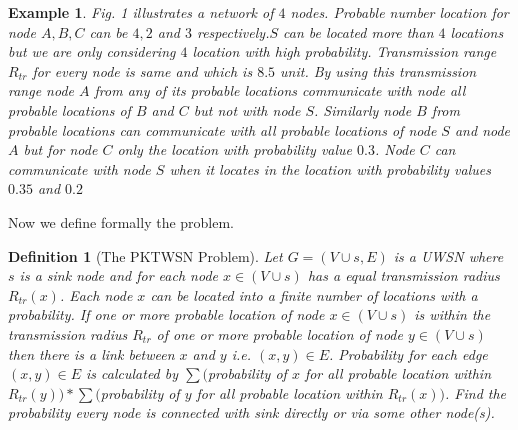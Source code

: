 \documentclass[12pt]{article}
\newtheorem*{defi}{Definition}
\newtheorem{exmp}{Example}[section]
\begin{document}
\begin{exmp}
Fig. 1 illustrates a network of $4$ nodes. Probable number location for node $A, B,C$ can be $4,2$ and $3$  respectively.$S$ can be located more than $4$ locations but we are only considering $4$ location with high probability. Transmission range \(R_{tr}\) for every node is same and which is $8.5$ unit. By using this transmission range node $A$ from any of its probable locations communicate with node all probable locations of $B$ and $C$ but not with node $S$. Similarly node $B$ from probable locations can communicate with all probable locations of node $S$ and node $A$ but for node $C$ only the location with probability value $0.3$. Node $C$ can communicate with node $S$ when it locates in the location with probability values $0.35$ and $0.2$
\end{exmp}
Now we define formally the problem.

\begin{defi}[The PKTWSN Problem]
Let $G=(V\cup{s},E)$ is a UWSN where $s$ is a sink node and for each node $x\in (V\cup{s})$ has a equal transmission radius $R_{tr}(x)$. Each node $x$ can be located into a finite number of locations with a probability. If one or more probable location of node $x\in (V\cup{s})$ is within the transmission radius $R_{tr}$ of one or more probable location of node $y\in (V\cup{s})$ then there is a link between $x$ and $y$ i.e. $(x,y)\in E$. Probability for each edge $(x,y)\in E$ is calculated by $\sum($probability of $x$ for all probable location within $R_{tr}(y))* \sum($probability of $y$ for all probable location within $R_{tr}(x))$.
Find the probability every node is connected with sink directly or via some other node(s).
\end{defi}

 \begin{comment}
If probable location of node \(u\in (V\cup\{s\})\) are \((x_1,y_1),(x_2,y_2),(x_3,y_3),...(x_n,y_n)\) and probable location of node \(v\in (V\cup\{s\})\) are  \((x'_1,y'_1),(x'_2,y'_2),(x'_3,y'_3),...,(x'_n,y'_n)\) and they are connected by an edge \(E\) then the associated probability of the edge can be calculated as follows \(\sum P(x_i,y_i)*P(x'_i,y'_i)\) where the euclidean distance between \((x_i,y_i)\) and \((x'_i,y'_i)\) is less than or equal \(R_s\).

\end{comment}
\end{document}
